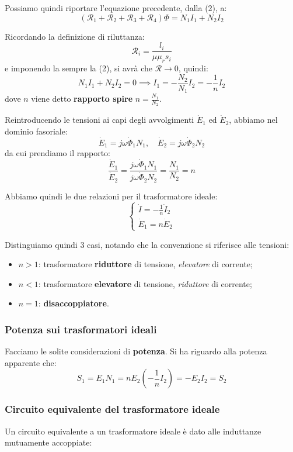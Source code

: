 \documentclass[a4paper,11pt]{article}
\begin{document}
Possiamo quindi riportare l'equazione precedente, dalla (2), a:
$$
(\mathcal{R}_1 + \mathcal{R}_2 + \mathcal{R}_3 + \mathcal{R}_4) \Phi = N_1 I_1 + N_2 I_2
$$

Ricordando la definizione di riluttanza:
$$
\mathcal{R}_i = \frac{l_i}{\mu \mu_r s_i}
$$
e imponendo la sempre la (2), si avrà che $\mathcal{R} \rightarrow 0$, quindi:
$$
N_1 I_1 + N_2 I_2 = 0 \implies I_1 = -\frac{N_2}{N_1} I_2 = -\frac{1}{n} I_2
$$
dove $n$ viene detto \textbf{rapporto spire} $n = \frac{N_1}{N_2}$.

Reintroducendo le tensioni ai capi degli avvolgimenti $\dot{E}_1$ ed $\dot{E}_2$, abbiamo nel dominio fasoriale:
$$
\dot{E}_1 = j \omega \dot{\Phi}_1 N_1, \quad \dot{E}_2 = j \omega \dot{\Phi}_2 N_2
$$
da cui prendiamo il rapporto:
$$
\frac{\dot{E}_1}{\dot{E}_2} = \frac{j \omega \dot{\Phi}_1 N_1}{j \omega \dot{\Phi}_2 N_2} = \frac{N_1}{N_2} = n
$$

Abbiamo quindi le due relazioni per il trasformatore ideale:
\[
	\begin{cases}
		\dot{I} = - \frac{1}{n} \dot{I}_2 \\ 
		\dot{E}_1 = n \dot{E}_2
	\end{cases}
\]

Distinguiamo quindi 3 casi, notando che la convenzione si riferisce alle tensioni:
\begin{itemize}
	\item $n > 1$: trasformatore \textbf{riduttore} di tensione, \textit{elevatore} di corrente;
	\item $n < 1$: trasformatore \textbf{elevatore} di tensione, \textit{riduttore} di corrente;
	\item $n = 1$: \textbf{disaccoppiatore}.
\end{itemize}

\subsubsection{Potenza sui trasformatori ideali}

Facciamo le solite considerazioni di \textbf{potenza}.
Si ha riguardo alla potenza apparente che:
$$
S_1 = E_1 N_1 = n E_2 \left( -\frac{1}{n} I_2 \right) = -E_2 I_2 = S_2
$$

\subsubsection{Circuito equivalente del trasformatore ideale}

Un circuito equivalente a un trasformatore ideale è dato alle induttanze mutuamente accoppiate:
\end{document}
